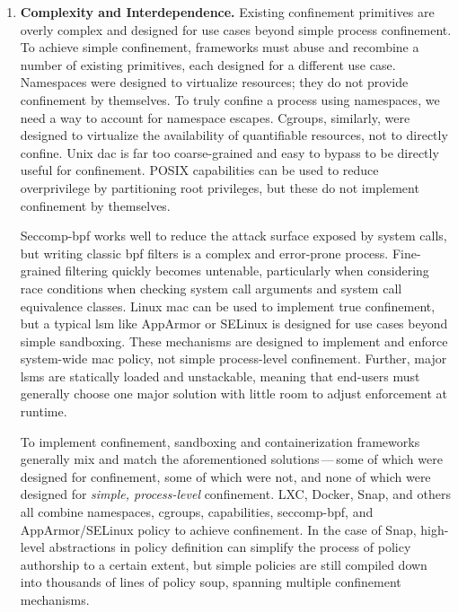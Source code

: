 \begin{enumerate}[font=\bfseries]
  \item \textbf{Complexity and Interdependence.}
    Existing confinement primitives are overly complex and designed for use cases beyond
    simple process confinement. To achieve simple confinement, frameworks must abuse and
    recombine a number of existing primitives, each designed for a different use case.
    Namespaces were designed to virtualize resources; they do not provide confinement by
    themselves. To truly confine a process using namespaces, we need a way to account for
    namespace escapes. Cgroups, similarly, were designed to virtualize the availability
    of quantifiable resources, not to directly confine. Unix \gls{dac} is far too
    coarse-grained and easy to bypass to be directly useful for confinement. POSIX
    capabilities can be used to reduce overprivilege by partitioning root privileges, but
    these do not implement confinement by themselves.

    Seccomp-bpf works well to reduce the attack surface exposed by system calls, but
    writing classic \gls{bpf} filters is a complex and error-prone process. Fine-grained
    filtering quickly becomes untenable, particularly when considering race conditions
    when checking system call arguments and system call equivalence classes.  Linux
    \gls{mac} can be used to implement true confinement, but a typical \gls{lsm} like
    AppArmor or SELinux is designed for use cases beyond simple sandboxing. These
    mechanisms are designed to implement and enforce system-wide \gls{mac} policy, not
    simple process-level confinement. Further, major \glspl{lsm} are statically loaded and
    unstackable, meaning that end-users must generally choose one major solution with
    little room to adjust enforcement at runtime.

    To implement confinement, sandboxing and containerization frameworks generally mix and
    match the aforementioned solutions\,---\,some of which were designed for confinement,
    some of which were not, and none of which were designed for \textit{simple,
    process-level} confinement. LXC, Docker, Snap, and others all combine namespaces,
    cgroups, capabilities, seccomp-bpf, and AppArmor/SELinux policy to achieve
    confinement. In the case of Snap, high-level abstractions in policy definition can
    simplify the process of policy authorship to a certain extent, but simple policies
    are still compiled down into thousands of lines of policy soup, spanning multiple
    confinement mechanisms.


\end{enumerate}

